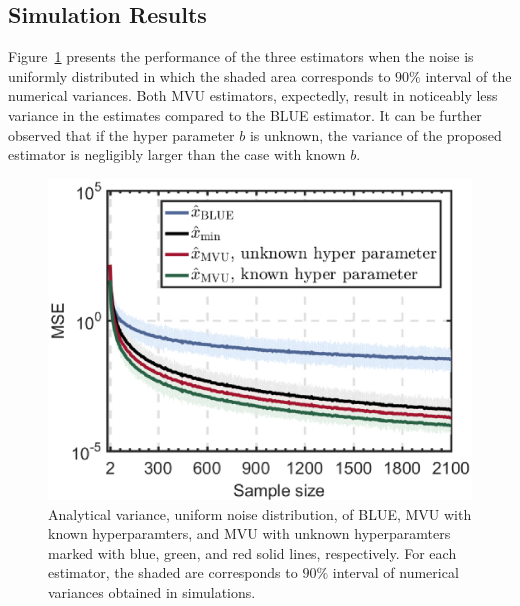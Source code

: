 \documentclass[journal]{IEEEtran}
\begin{document}
\subsection{Simulation Results}
Figure~\ref{fig:uniform_blue_mvu} presents the performance of the three estimators when the noise is uniformly distributed in which the shaded area corresponds to $90\%$ interval of the numerical variances. Both MVU estimators, expectedly, result in noticeably less variance in the estimates compared to the BLUE estimator. It can be further observed that if the hyper parameter $b$ is unknown, the variance of the proposed estimator is negligibly larger than the case with known $b$. 
%
%
\begin{figure}[!t] 
	\centering
	\includegraphics[width=\columnwidth]{uniform_blue_mvu}
	\caption{Analytical variance, uniform noise distribution, of BLUE, MVU with known hyperparamters, and MVU with unknown hyperparamters marked with blue, green, and red solid lines, respectively. For each estimator, the shaded are corresponds to $90\%$ interval of numerical variances obtained in simulations.}		
	\label{fig:uniform_blue_mvu}
\end{figure}
%
%
%
%
\end{document}
